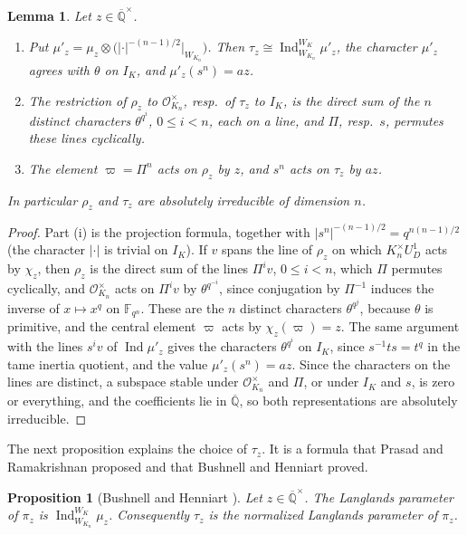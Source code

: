\documentclass[a4paper,11pt]{amsart}
\newtheorem{proposition}[theorem]{Proposition}
\newtheorem{lemma}[theorem]{Lemma}
\theoremstyle{definition}
\theoremstyle{remark}
\numberwithin{equation}{section}
\newcommand{\F}{\mathbb{F}}
\newcommand{\Qbar}{\overline{\mathbb{Q}}}
\newcommand{\OO}{\mathcal{O}}
\DeclareMathOperator{\Ind}{Ind}
\begin{document}
\begin{lemma}\label{lem:shape}
Let $z\in\Qbar^\times$.
\begin{enumerate}
\item[(i)] Put $\mu'_z=\mu_z\otimes\bigl(|\cdot|^{-(n-1)/2}|_{W_{K_n}}\bigr)$. Then $\tau_z\cong\Ind_{W_{K_n}}^{W_K}\mu'_z$, the character $\mu'_z$ agrees with $\theta$ on $I_K$, and $\mu'_z(s^n)=az$.
\item[(ii)] The restriction of $\rho_z$ to $\OO_{K_n}^\times$, resp.\ of $\tau_z$ to $I_K$, is the direct sum of the $n$ distinct characters $\theta^{q^i}$, $0\leq i<n$, each on a line, and $\Pi$, resp.\ $s$, permutes these lines cyclically.
\item[(iii)] The element $\varpi=\Pi^n$ acts on $\rho_z$ by $z$, and $s^n$ acts on $\tau_z$ by $az$.
\end{enumerate}
In particular $\rho_z$ and $\tau_z$ are absolutely irreducible of dimension $n$.
\end{lemma}

\begin{proof}
Part (i) is the projection formula, together with $|s^n|^{-(n-1)/2}=q^{n(n-1)/2}$ (the character $|\cdot|$ is trivial on $I_K$). If $v$ spans the line of $\rho_z$ on which $K_n^\times U_D^1$ acts by $\chi_z$, then $\rho_z$ is the direct sum of the lines $\Pi^iv$, $0\leq i<n$, which $\Pi$ permutes cyclically, and $\OO_{K_n}^\times$ acts on $\Pi^iv$ by $\theta^{q^{-i}}$, since conjugation by $\Pi^{-1}$ induces the inverse of $x\mapsto x^q$ on $\F_{q^n}$. These are the $n$ distinct characters $\theta^{q^j}$, because $\theta$ is primitive, and the central element $\varpi$ acts by $\chi_z(\varpi)=z$. The same argument with the lines $s^iv$ of $\Ind\mu'_z$ gives the characters $\theta^{q^i}$ on $I_K$, since $s^{-1}ts=t^q$ in the tame inertia quotient, and the value $\mu'_z(s^n)=az$. Since the characters on the lines are distinct, a subspace stable under $\OO_{K_n}^\times$ and $\Pi$, or under $I_K$ and $s$, is zero or everything, and the coefficients lie in $\Qbar$, so both representations are absolutely irreducible.
\end{proof}

The next proposition explains the choice of $\tau_z$. It is a formula that Prasad and Ramakrishnan proposed \cite[Theorem~4.4]{PR12} and that Bushnell and Henniart proved.

\begin{proposition}[Bushnell and Henniart {\cite[6.3, Corollary~1]{BH11L}}]
\label{prop:depth-zero-parameter}
Let $z\in\Qbar^\times$. The Langlands parameter of $\pi_z$ is $\Ind_{W_{K_n}}^{W_K}\mu_z$. Consequently $\tau_z$ is the normalized Langlands parameter of $\pi_z$.
\end{proposition}
\end{document}
